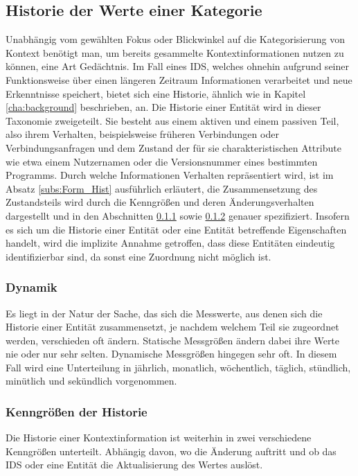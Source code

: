 \subsection{Historie der Werte einer Kategorie}
Unabhängig vom gewählten Fokus oder Blickwinkel auf die Kategorisierung von Kontext benötigt man, um bereits gesammelte Kontextinformationen nutzen zu können, eine Art Gedächtnis. Im Fall eines IDS, welches ohnehin aufgrund seiner Funktionsweise über einen längeren Zeitraum Informationen verarbeitet und neue Erkenntnisse speichert, bietet sich eine Historie, ähnlich wie in Kapitel \ref{cha:background} beschrieben, an.
Die Historie einer Entität wird in dieser Taxonomie zweigeteilt. Sie besteht aus einem aktiven und einem passiven Teil, also ihrem Verhalten, beispielsweise früheren Verbindungen oder Verbindungsanfragen und dem Zustand der für sie charakteristischen Attribute wie etwa einem Nutzernamen oder die Versionsnummer eines bestimmten Programms.
Durch welche Informationen Verhalten repräsentiert wird, ist im Absatz \ref{subs:Form_Hist} ausführlich erläutert, die Zusammensetzung des Zustandsteils wird durch die Kenngrößen und deren Änderungsverhalten dargestellt und in den Abschnitten \ref{subsub:dyn} sowie \ref{subsub:his_val} genauer spezifiziert. Insofern es sich um die Historie einer Entität oder eine Entität betreffende Eigenschaften handelt, wird die implizite Annahme getroffen, dass diese Entitäten eindeutig identifizierbar sind, da sonst eine Zuordnung nicht möglich ist.
\subsubsection{Dynamik}
\label{subsub:dyn}
Es liegt in der Natur der Sache, das sich die Messwerte, aus denen sich die Historie einer Entität zusammensetzt, je nachdem welchem Teil sie zugeordnet werden, verschieden oft ändern.
Statische Messgrößen ändern dabei ihre Werte nie oder nur sehr selten. Dynamische Messgrößen hingegen sehr oft. In diesem Fall wird eine Unterteilung in jährlich, monatlich, wöchentlich, täglich, stündlich, minütlich und sekündlich vorgenommen. 
\subsubsection{Kenngrößen der Historie}
\label{subsub:his_val}
Die Historie einer Kontextinformation ist weiterhin in zwei verschiedene Kenngrößen unterteilt. Abhängig davon, wo die Änderung auftritt und ob das IDS oder eine Entität die Aktualisierung des Wertes auslöst.
